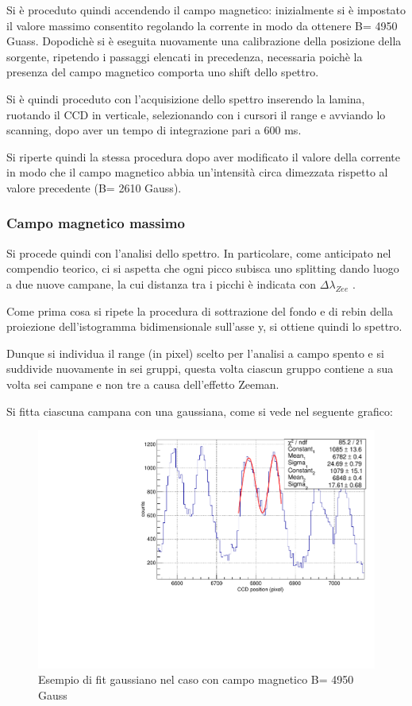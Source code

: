 \documentclass{article}
\begin{document}
	Si è proceduto quindi accendendo il campo magnetico: inizialmente si è impostato il valore massimo consentito regolando la corrente in modo da ottenere B= 4950 Guass. 
	Dopodichè si è eseguita nuovamente una calibrazione della posizione della sorgente, ripetendo i passaggi elencati in precedenza, necessaria poichè la presenza del campo magnetico comporta uno shift dello spettro.

	Si è quindi proceduto con l'acquisizione dello spettro inserendo la lamina, ruotando il CCD in verticale, selezionando con i cursori il range e avviando lo scanning, dopo aver un tempo di integrazione pari a 600 ms.
	
	Si riperte quindi  la stessa procedura dopo aver modificato il valore della corrente in modo che il campo magnetico abbia un'intensità circa dimezzata rispetto al valore precedente (B= 2610 Gauss).
	
	\subsubsection*{Campo magnetico massimo}
	Si procede quindi con l'analisi dello spettro.
	In particolare, come anticipato nel compendio teorico, ci si aspetta che ogni picco subisca uno splitting dando luogo a due nuove campane, la cui distanza tra i picchi è indicata con $\Delta \lambda_{Zee} $ .
	 
	 Come prima cosa si ripete la procedura di sottrazione del fondo e di rebin della proiezione dell'istogramma bidimensionale sull'asse y, si ottiene quindi lo spettro.
	 
	Dunque si individua il range (in pixel) scelto per l'analisi a campo spento e si suddivide nuovamente in sei gruppi, questa volta ciascun gruppo contiene a sua volta sei campane e non tre a causa dell'effetto Zeeman.
	
	Si fitta ciascuna campana con una gaussiana, come si vede nel seguente grafico:
	
	\begin{center}
		\begin{figure}[H]
			\centering
			\includegraphics[scale=0.38, angle=0]{campomax/singolo.pdf}
			\caption{ Esempio di fit gaussiano nel caso con campo magnetico B= 4950 Gauss}
			\label{fig:singoloBonMax}
		\end{figure}
	\end{center}
	 
\end{document}
